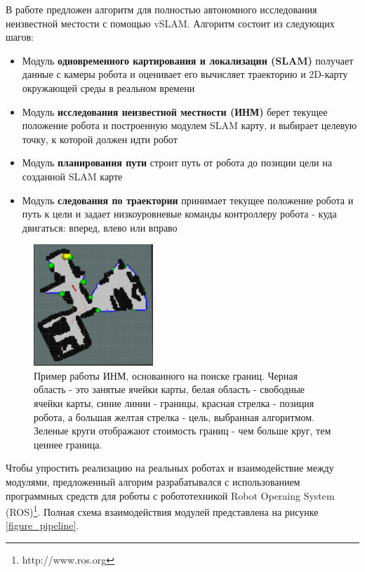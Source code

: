 \documentclass{mipt-thesis-ms}
\begin{document}
	В работе предложен алгоритм для полностью автономного исследования неизвестной местости с помощью vSLAM. Алгоритм состоит из следующих шагов: 
	
	\begin{itemize}
		\item Модуль \textbf{одновременного картирования и локализации (SLAM)} получает данные с камеры робота и оценивает его вычисляет траекторию и 2D-карту окружающей среды в реальном времени 
		\item Модуль \textbf{исследования неизвестной местности (ИНМ)} берет текущее положение робота и построенную модулем SLAM карту, и выбирает целевую точку, к которой должен идти робот 
		\item Модуль \textbf{планирования пути} строит путь от робота до позиции цели на созданной SLAM карте 
		\item Модуль \textbf{следования по траектории} принимает текущее положение робота и путь к цели и задает низкоуровневые команды контроллеру робота - куда двигаться: вперед, влево или вправо 
	\end{itemize}

	\begin{figure}
		\centering
		\includegraphics[width=0.4\textwidth]{img/exploration_sample.png}
		\caption{Пример работы ИНМ, основанного на поиске границ. Черная область - это занятые ячейки карты, белая область - свободные ячейки карты, синие линии - границы, красная стрелка - позиция робота, а большая желтая стрелка - цель, выбранная алгоритмом. Зеленые круги отображают стоимость границ - чем больше круг, тем ценнее граница. }
		\label{figure_frontiers}
	\end{figure}
	
	Чтобы упростить реализацию на реальных роботах и взаимодействие между модулями, предложенный алгорим разрабатывался с использованием программных средств для роботы с робототехникой Robot Operaing System (ROS)\footnote {http://www.ros.org}. Полная схема взаимодействия модулей представлена на рисунке \ref{figure_pipeline}.
	
\end{document}
